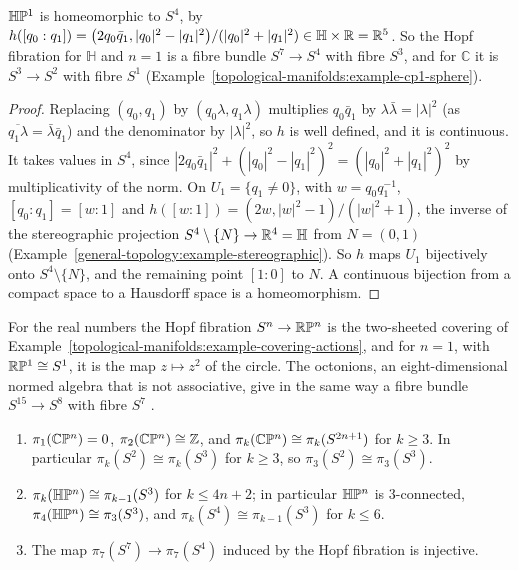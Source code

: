 \begin{proposition}\label{topological-manifolds:proposition-hp1-sphere}
$\mathbb{H}\mathbb{P}^1$ is homeomorphic to $S^4$, by $h([q_0 : q_1]) = \bigl(2q_0\bar q_1, |q_0|^2 - |q_1|^2\bigr)/(|q_0|^2 + |q_1|^2) \in \mathbb{H} \times \mathbb{R} = \mathbb{R}^5$. So the Hopf fibration for $\mathbb{H}$ and $n = 1$ is a fibre
bundle $S^7 \to S^4$ with fibre $S^3$, and for $\mathbb{C}$ it is $S^3 \to S^2$ with fibre $S^1$ (Example~\ref{topological-manifolds:example-cp1-sphere}).
\end{proposition}

\begin{proof}
Replacing $(q_0, q_1)$ by $(q_0\lambda, q_1\lambda)$ multiplies $q_0\bar q_1$ by $\lambda\bar\lambda = |\lambda|^2$ (as $\overline{q_1\lambda} = \bar\lambda\bar q_1$) and the denominator by $|\lambda|^2$, so $h$ is well defined, and it is continuous.
It takes values in $S^4$, since $|2q_0\bar q_1|^2 + (|q_0|^2 - |q_1|^2)^2 = (|q_0|^2 + |q_1|^2)^2$ by multiplicativity of the norm. On $U_1 = \{q_1 \neq 0\}$, with $w = q_0q_1^{-1}$, $[q_0 : q_1] = [w : 1]$ and
$h([w : 1]) = (2w, |w|^2 - 1)/(|w|^2 + 1)$, the inverse of the stereographic projection $S^4 \setminus \{N\} \to \mathbb{R}^4 = \mathbb{H}$ from $N = (0, 1)$ (Example~\ref{general-topology:example-stereographic}). So $h$ maps $U_1$
bijectively onto $S^4 \setminus \{N\}$, and the remaining point $[1 : 0]$ to $N$. A continuous bijection from a compact space to a Hausdorff space is a homeomorphism.
\end{proof}

For the real numbers the Hopf fibration $S^n \to \mathbb{R}\mathbb{P}^n$ is the two-sheeted covering of Example~\ref{topological-manifolds:example-covering-actions}, and for $n = 1$, with $\mathbb{R}\mathbb{P}^1 \cong S^1$, it is the map
$z \mapsto z^2$ of the circle. The octonions, an eight-dimensional normed algebra that is not associative, give in the same way a fibre bundle $S^{15} \to S^8$ with fibre $S^7$ \cite[Section 4.2]{hatcher-at}.

\begin{corollary}\label{topological-manifolds:corollary-hopf-homotopy}
\begin{enumerate}
\item $\pi_1(\mathbb{C}\mathbb{P}^n) = 0$, $\pi_2(\mathbb{C}\mathbb{P}^n) \cong \mathbb{Z}$, and $\pi_k(\mathbb{C}\mathbb{P}^n) \cong \pi_k(S^{2n+1})$ for $k \geq 3$. In particular $\pi_k(S^2) \cong \pi_k(S^3)$ for $k \geq 3$, so $\pi_3(S^2) \cong \pi_3(S^3)$.
\item $\pi_k(\mathbb{H}\mathbb{P}^n) \cong \pi_{k-1}(S^3)$ for $k \leq 4n + 2$; in particular $\mathbb{H}\mathbb{P}^n$ is $3$-connected, $\pi_4(\mathbb{H}\mathbb{P}^n) \cong \pi_3(S^3)$, and $\pi_k(S^4) \cong \pi_{k-1}(S^3)$ for $k \leq 6$.
\item The map $\pi_7(S^7) \to \pi_7(S^4)$ induced by the Hopf fibration is injective.
\end{enumerate}
\end{corollary}

